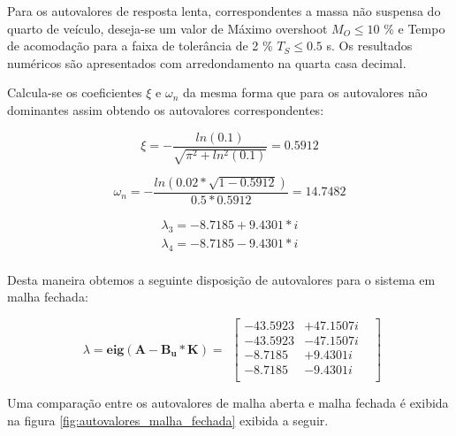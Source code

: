 \documentclass[a4paper]{ifacconf}
\begin{document}
Para os autovalores de resposta lenta, correspondentes a massa não suspensa do quarto de veículo, deseja-se um valor de Máximo overshoot $M_O \leq 10$ \% e Tempo de acomodação para a faixa de tolerância de 2 \% $T_S \leq 0.5$ s. Os resultados numéricos são apresentados com arredondamento na quarta casa decimal.

Calcula-se os coeficientes $\xi$ e $\omega_n$ da mesma forma que para os autovalores não dominantes assim obtendo os autovalores correspondentes:

\begin{equation*}
    \xi=-\frac{ln\left(0.1\right)}{\sqrt{\pi^2+ln^2(0.1)}}=0.5912
\end{equation*}

\begin{equation*}
    \omega_n=-\frac{ln\left( 0.02*\sqrt{1-0.5912} \right)}{0.5*0.5912}=14.7482
\end{equation*}

\begin{align*} \label{eq:autovalores_dominantes}
     \lambda_3 = -8.7185 + 9.4301*i\\
     \lambda_4 = -8.7185 - 9.4301*i\\
\end{align*}

Desta maneira obtemos a seguinte disposição de autovalores para o sistema em malha fechada:

\begin{equation} \label{eq:autovalores_malha_fechada}
        \begin{split}
             \lambda=\mathbf{eig(A-B_u*K)}=
        \end{split}
        \begin{bmatrix}
            -43.5923& + 47.1507i&\\
            -43.5923& - 47.1507i&\\
            -8.7185& + 9.4301i&\\
            -8.7185& - 9.4301i&\\
        \end{bmatrix}
    \end{equation}

Uma comparação entre os autovalores de malha aberta e malha fechada é exibida na figura \ref{fig:autovalores_malha_fechada} exibida a seguir.
\end{document}

